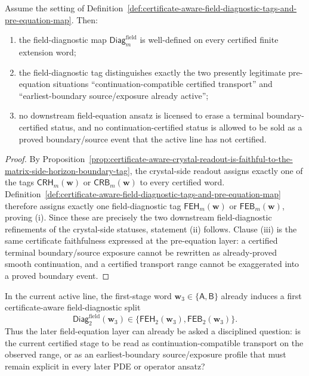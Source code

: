 \begin{proposition}
\label{prop:certificate-aware-field-diagnostics-are-faithful-to-the-crystal-side-tag}
Assume the setting of Definition~\ref{def:certificate-aware-field-diagnostic-tags-and-pre-equation-map}. Then:
\begin{enumerate}[label=(\roman*)]
  \item the field-diagnostic map \(\mathsf{Diag}^{\mathrm{field}}_{m}\) is well-defined on every certified finite extension word;
  \item the field-diagnostic tag distinguishes exactly the two presently legitimate pre-equation situations ``continuation-compatible certified transport'' and ``earliest-boundary source/exposure already active'';
  \item no downstream field-equation ansatz is licensed to erase a terminal boundary-certified status, and no continuation-certified status is allowed to be sold as a proved boundary/source event that the active line has not certified.
\end{enumerate}
\end{proposition}

\begin{proof}
By Proposition~\ref{prop:certificate-aware-crystal-readout-is-faithful-to-the-matrix-side-horizon-boundary-tag}, the crystal-side readout assigns exactly one of the tags \(\mathsf{CRH}_{m}(\mathbf w)\) or \(\mathsf{CRB}_{m}(\mathbf w)\) to every certified word. Definition~\ref{def:certificate-aware-field-diagnostic-tags-and-pre-equation-map} therefore assigns exactly one field-diagnostic tag \(\mathsf{FEH}_{m}(\mathbf w)\) or \(\mathsf{FEB}_{m}(\mathbf w)\), proving (i). Since these are precisely the two downstream field-diagnostic refinements of the crystal-side statuses, statement (ii) follows. Clause (iii) is the same certificate faithfulness expressed at the pre-equation layer: a certified terminal boundary/source exposure cannot be rewritten as already-proved smooth continuation, and a certified transport range cannot be exaggerated into a proved boundary event.
\end{proof}

\begin{corollary}
\label{cor:present-sigma3-package-already-induces-first-certificate-aware-field-diagnostic-split}
In the current active line, the first-stage word \(\mathbf w_3\in\{\mathsf A,\mathsf B\}\) already induces a first certificate-aware field-diagnostic split
\[
  \mathsf{Diag}^{\mathrm{field}}_{2}(\mathbf w_3)
  \in
  \{\mathsf{FEH}_{2}(\mathbf w_3),\mathsf{FEB}_{2}(\mathbf w_3)\}.
\]
Thus the later field-equation layer can already be asked a disciplined question: is the current certified stage to be read as continuation-compatible transport on the observed range, or as an earliest-boundary source/exposure profile that must remain explicit in every later PDE or operator ansatz?
\end{corollary}

